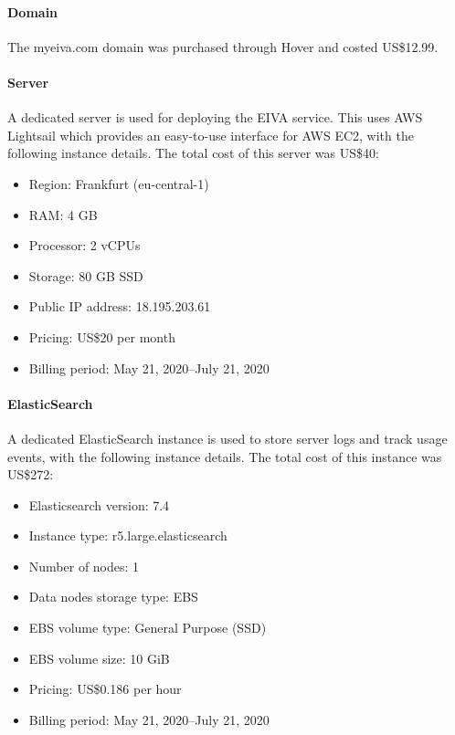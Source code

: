 \documentclass{article}
\begin{document}
\paragraph{Domain}

The myeiva.com domain was purchased through Hover and costed US\$12.99.

\paragraph{Server}

A dedicated server is used for deploying the EIVA service. This uses AWS Lightsail which provides an easy-to-use interface for AWS EC2, with the following instance details. The total cost of this server was US\$40:

\begin{itemize}
	\item Region: Frankfurt (eu-central-1)
	\item RAM: 4 GB
	\item Processor: 2 vCPUs
	\item Storage: 80 GB SSD
	\item Public IP address: 18.195.203.61
	\item Pricing: US\$20 per month
	\item Billing period: May 21, 2020--July 21, 2020
\end{itemize}

\paragraph{ElasticSearch}

A dedicated ElasticSearch instance is used to store server logs and track usage events, with the following instance details. The total cost of this instance was US\$272:

\begin{itemize}
	\item Elasticsearch version: 7.4
	\item Instance type: r5.large.elasticsearch
	\item Number of nodes: 1
	\item Data nodes storage type: EBS
	\item EBS volume type: General Purpose (SSD)
	\item EBS volume size: 10 GiB
	\item Pricing: US\$0.186 per hour
	\item Billing period: May 21, 2020--July 21, 2020
\end{itemize}
\end{document}
